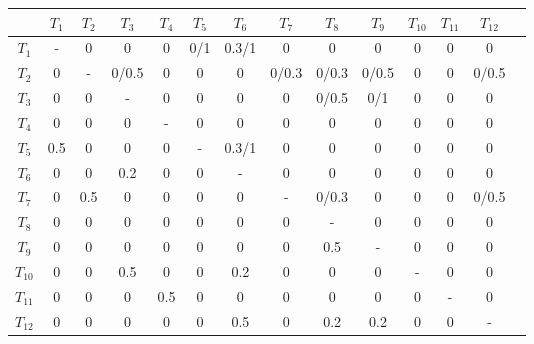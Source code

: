 \documentclass[letterpaper]{article}
\begin{document}
    \begin{table}[h!]
      \centering
      \small
      \begin{tabular}{c|ccccccccccccc}
        & $T_1$ & $T_2$ & $T_3$ & $T_4$ & $T_5$ & $T_6$ & $T_7$ & $T_8$ & $T_9$ & $T_{10}$ & $T_{11}$ & $T_{12}$ \\
        \hline
        $T_1$       & -     & 0     & 0         & 0     & 0/1   & 0.3/1     & 0         & 0         & 0         & 0     & 0     & 0         \\
        $T_2$       & 0     & -     & 0/0.5     & 0     & 0     & 0         & 0/0.3     & 0/0.3     & 0/0.5     & 0     & 0     & 0/0.5     \\
        $T_3$       & 0     & 0     & -         & 0     & 0     & 0         & 0         & 0/0.5     & 0/1       & 0     & 0     & 0         \\
        $T_4$       & 0     & 0     & 0         & -     & 0     & 0         & 0         & 0         & 0         & 0     & 0     & 0         \\
        $T_5$       & 0.5   & 0     & 0         & 0     & -     & 0.3/1     & 0         & 0         & 0         & 0     & 0     & 0         \\
        $T_6$       & 0     & 0     & 0.2       & 0     & 0     & -         & 0         & 0         & 0         & 0     & 0     & 0         \\
        $T_7$       & 0     & 0.5   & 0         & 0     & 0     & 0         & -         & 0/0.3     & 0         & 0     & 0     & 0/0.5     \\
        $T_8$       & 0     & 0     & 0         & 0     & 0     & 0         & 0         & -         & 0         & 0     & 0     & 0         \\
        $T_9$       & 0     & 0     & 0         & 0     & 0     & 0         & 0         & 0.5       & -         & 0     & 0     & 0         \\
        $T_{10}$    & 0     & 0     & 0.5       & 0     & 0     & 0.2       & 0         & 0         & 0         & -     & 0     & 0         \\
        $T_{11}$    & 0     & 0     & 0         & 0.5   & 0     & 0         & 0         & 0         & 0         & 0     & -     & 0         \\
        $T_{12}$    & 0     & 0     & 0         & 0     & 0     & 0.5       & 0         & 0.2       & 0.2       & 0     & 0     & -         \\
      \end{tabular}
    \end{table}
\end{document}
